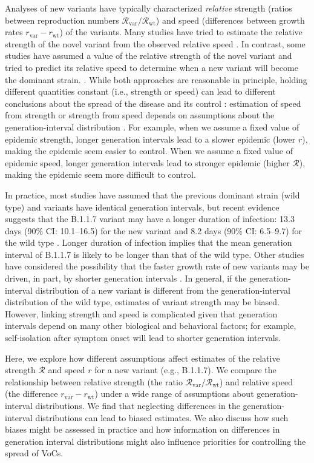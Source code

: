 \documentclass[12pt]{article}
\newcommand{\vvvar}{\mathrm{var}}
\newcommand{\wwwt}{\mathrm{wt}}
\newcommand{\rx}[1]{\ensuremath{{r}_{#1}}\xspace}
\newcommand{\rw}{\rx{\wwwt}}
\newcommand{\rv}{\rx{\vvvar}}
\newcommand{\Rx}[1]{\ensuremath{{\mathcal R}_{#1}}\xspace}
\newcommand{\RR}{\ensuremath{{\mathcal R}}\xspace}
\newcommand{\Rw}{\Rx{\wwwt}}
\newcommand{\Rv}{\Rx{\vvvar}}
\begin{document}
Analyses of new variants have typically characterized \emph{relative} strength (ratios between reproduction numbers $\Rv/\Rw$) and speed (differences between growth rates $\rv-\rw$) of the variants.
Many studies have tried to estimate the relative strength of the novel variant from the observed relative speed \citep{davies2021estimated, leung2021early, volz2021transmission,zhao2021}.
In contrast, some studies have assumed a value of the relative strength of the novel variant and tried to predict its relative speed to determine when a new variant will become the dominant strain. \citep{davies2021estimated}.
While both approaches are reasonable in principle, holding different quantities constant (i.e., strength or speed) can lead to different conclusions about the spread of the disease and its control \citep{doi:10.1098/rspb.2020.1556}:
estimation of speed from strength or strength from speed depends on assumptions about the generation-interval distribution \citep{roberts2007model,svensson2007note,wallinga2007generation}.
For example, when we assume a fixed value of epidemic strength, longer generation intervals lead to a slower epidemic (lower $r$), making the epidemic seem easier to control.
When we assume a fixed value of epidemic speed, longer generation intervals lead to stronger epidemic (higher $\RR$), making the epidemic seem more difficult to control.

In practice, most studies have assumed that the previous dominant strain (wild type) and variants have identical generation intervals, but recent evidence suggests that the B.1.1.7 variant may have a longer duration of infection: 13.3 days (90\% CI: 10.1--16.5) for the new variant and 8.2 days (90\% CI: 6.5--9.7) for the wild type \citep{kissler2021densely}.
Longer duration of infection implies that the mean generation interval of B.1.1.7 is likely to be longer than that of the wild type.
Other studies have considered the possibility that the faster growth rate of new variants may be driven, in part, by shorter generation intervals \citep{davies2021estimated,volz2021transmission}.
In general, if the generation-interval distribution of a new variant is different from the generation-interval distribution of the wild type, estimates of variant strength may be biased.
However, linking strength and speed is complicated given that generation intervals depend on many other biological and behavioral factors;
for example, self-isolation after symptom onset will lead to shorter generation intervals.

Here, we explore how different assumptions affect estimates of the relative strength $\RR$ and speed $r$ for a new variant (e.g., B.1.1.7).
We compare the relationship between relative strength (the ratio $\Rv/\Rw$) and relative speed (the difference $\rv-\rw$) under a wide range of assumptions about generation-interval distributions.
We find that neglecting differences in the generation-interval distributions can lead to biased estimates.
We also discuss how such biases might be assessed in practice and how information on differences in generation interval distributions might also influence priorities for controlling the spread of VoCs.
\end{document}

